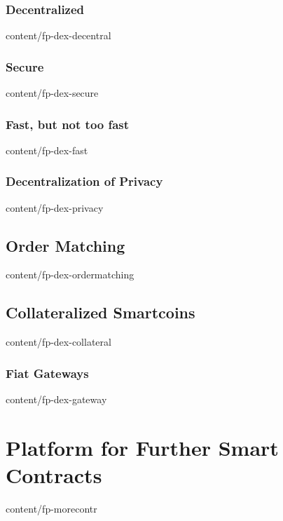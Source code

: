 \documentclass{btswhitepaper}
\begin{document}
\subsubsection  { Decentralized                                    }  { content/fp-dex-decentral       } 
\subsubsection  { Secure                                           }  { content/fp-dex-secure          } 
\subsubsection  { Fast, but not too fast                           }  { content/fp-dex-fast            } 
\subsubsection  { Decentralization of Privacy                      }  { content/fp-dex-privacy         } 
\subsection     { Order Matching                                   }  { content/fp-dex-ordermatching   } 
\subsection     { Collateralized Smartcoins                        }  { content/fp-dex-collateral      } 
\subsubsection  { Fiat Gateways                                    }  { content/fp-dex-gateway         } 

\section        { Platform for Further Smart Contracts             }  { content/fp-morecontr           }
\end{document}
